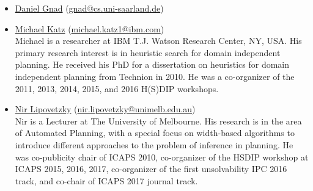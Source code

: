 \documentclass[10pt]{article}
\begin{document}
\begin{itemize}




%

\item \href{http://}{Daniel Gnad}
  (\href{mailto:gnad@cs.uni-saarland.de}{gnad@cs.uni-saarland.de})\\

\item \href{https://resedit.watson.ibm.com/researcher/view.php?person=ibm-Michael.Katz1}{Michael Katz}
 (\href{mailto:michael.katz1@ibm.com}{michael.katz1@ibm.com})\\
 Michael is a researcher at IBM T.J. Watson Research Center, NY, USA. His
 primary research interest is in heuristic search for domain independent planning.
 He received his PhD for a dissertation on heuristics for domain independent
 planning from Technion in 2010.
 He was a co-organizer of the 2011, 2013, 2014, 2015, and 2016 H(S)DIP
 workshops.

\item \href{http://people.eng.unimelb.edu.au/nlipovetzky/}{Nir Lipovetzky}
  (\href{mailto:nir.lipovetzky@unimelb.edu.au}{nir.lipovetzky@unimelb.edu.au})\\
Nir is a Lecturer at The University of Melbourne. 
His research is in the area of Automated Planning, with a special focus on width-based algorithms
to introduce different approaches to the problem of inference in planning. He was co-publicity chair of ICAPS 2010, co-organizer
of the HSDIP workshop at ICAPS 2015, 2016, 2017, co-organizer of the first unsolvability IPC 2016 track, and co-chair of ICAPS 2017 journal track.


\end{itemize}
\end{document}
